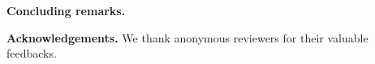 \documentclass{sig-alternate}
\begin{document}
\textbf{Concluding remarks.}
\label{sec:conclusion}


\textbf{Acknowledgements.} We thank anonymous reviewers for their valuable feedbacks.
%
\scriptsize
\vspace*{-1.059722524461626mm}

%
%

\end{document}
